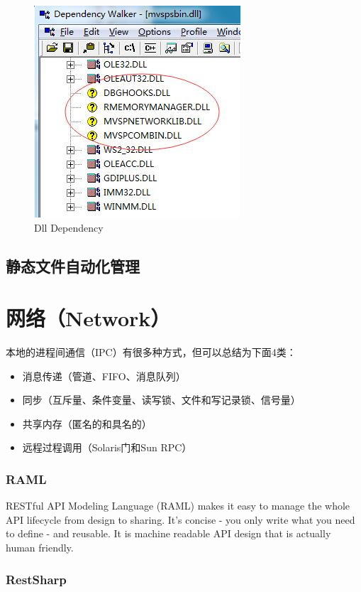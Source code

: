 \documentclass{book}
\begin{document}
\begin{figure}[htbp]
	\centering
	\includegraphics[scale=0.6]{AnalyseDllDependency.jpg}
	\caption{Dll Dependency}
	\label{fig:AnalyseDllDependency}
\end{figure}


\section{静态文件自动化管理}

\chapter{网络（Network）}

本地的进程间通信（IPC）有很多种方式，但可以总结为下面4类：

\begin{itemize}
	\item{消息传递（管道、FIFO、消息队列）}
	\item{同步（互斥量、条件变量、读写锁、文件和写记录锁、信号量）}
	\item{共享内存（匿名的和具名的）}
	\item{远程过程调用（Solaris门和Sun RPC）}
\end{itemize}

\subsection{RAML}

RESTful API Modeling Language (RAML) makes it easy to 
manage the whole API lifecycle from design to sharing. 
It's concise - you only write what you need to define - and reusable. 
It is machine readable API design that is actually human friendly.

\subsection{RestSharp}
\end{document}
